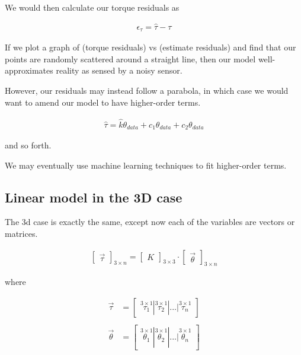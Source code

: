 \documentclass[preprint,12pt,3p]{elsarticle}
\begin{document}
We would then calculate our torque residuals as

\begin{align}
 \epsilon_{\tau} = \hat{\tau} - \tau 
\end{align}

If we plot a graph of (torque residuals) vs (estimate residuals) and find that our points are randomly scattered around a straight line, then our model well-approximates reality as sensed by a noisy sensor.

However, our residuals may instead follow a parabola, in which case we would want to amend our model
to have higher-order terms.

\begin{align}
 \hat{\tau} = \hat{k}\theta_{data} +c_1 \theta_{data} + c_2 \theta_{data}
\end{align}

and so forth. 

We may eventually use machine learning techniques to fit higher-order terms.

\subsection{Linear model in the 3D case}
\label{3d case}
The 3d case is exactly the same, except now each of the variables are vectors or matrices. 

\begin{align}
    \begin{bmatrix} \vec{\tau} \end{bmatrix}_{3\times n}  = \begin{bmatrix} K \end{bmatrix}_{3\times 3} \cdot \begin{bmatrix} \vec{\theta} \end{bmatrix}_{3\times n} 
\end{align}

where

\begin{align}
\vec{\tau} &= \begin{bmatrix} \stackrel{3\times 1}{\tau_1} | \stackrel{3\times 1}{\tau_2} | ... |\stackrel{3\times 1}{\tau_n} \end{bmatrix} \\
\\
\vec{\theta} &= \begin{bmatrix} \stackrel{3\times 1}{\theta_1} | \stackrel{3\times 1}{\theta_2} | ... |\stackrel{3\times 1}{\theta_n} \end{bmatrix}
\end{align}
\end{document}
